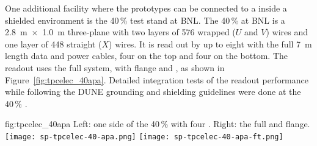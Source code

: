 One additional facility where the  prototypes can be connected to
a  inside a shielded environment is the \num{40}\,\%  
test stand at BNL. The \num{40}\,\%  at BNL is a \SI{2.8}{m}~$\times$~\SI{1.0}{m} three-plane  with two 
layers of \num{576} wrapped ($U$ and $V$) wires and one layer of \num{448} straight ($X$) wires. It is read 
out by up to eight  with the full \SI{7}{m}  length data and  power cables, 
four on the top and four on the bottom. The readout uses the full  system, with  flange 
and , as shown in Figure~\ref{fig:tpcelec_40apa}. Detailed integration tests of the 
 readout performance while following the DUNE grounding and shielding guidelines were done at the 
\num{40}\,\% .

\begin{dunefigure}
{fig:tpcelec_40apa}
{Left: one side of the \num{40}\,\%  with four .  Right: the full  \fdth and flange.}
\texttt{[image: sp-tpcelec-40-apa.png]}
\hspace{3mm}
\texttt{[image: sp-tpcelec-40-apa-ft.png]}
\end{dunefigure}



